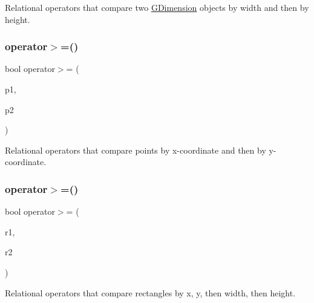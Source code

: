 Relational operators that compare two \mbox{\hyperlink{structsgl_1_1GDimension}{G\+Dimension}} objects by width and then by height. 

\mbox{\label{namespacesgl_a0f6d51aeb0175e5c7ae32b43f732a742}} 
\subsubsection{\texorpdfstring{operator$>$=()}{operator>=()}\hspace{0.1cm}{\footnotesize\ttfamily [2/4]}}
{\footnotesize\ttfamily bool operator$>$= (\begin{DoxyParamCaption}\item[{const \mbox{\hyperlink{structsgl_1_1GPoint}{G\+Point}} \&}]{p1,  }\item[{const \mbox{\hyperlink{structsgl_1_1GPoint}{G\+Point}} \&}]{p2 }\end{DoxyParamCaption})}



Relational operators that compare points by x-\/coordinate and then by y-\/coordinate. 

\mbox{\label{namespacesgl_a206b248cb2a1fdece41beb61e5d41904}} 
\subsubsection{\texorpdfstring{operator$>$=()}{operator>=()}\hspace{0.1cm}{\footnotesize\ttfamily [3/4]}}
{\footnotesize\ttfamily bool operator$>$= (\begin{DoxyParamCaption}\item[{const \mbox{\hyperlink{structsgl_1_1GRectangle}{G\+Rectangle}} \&}]{r1,  }\item[{const \mbox{\hyperlink{structsgl_1_1GRectangle}{G\+Rectangle}} \&}]{r2 }\end{DoxyParamCaption})}



Relational operators that compare rectangles by x, y, then width, then height. 

\mbox{\label{namespacesgl_acf9f17dc5ff0155b2456a1aae51ec921}} 
